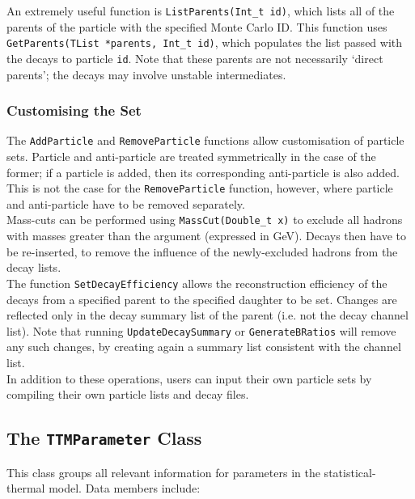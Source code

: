 \documentclass{elsarticle}
\begin{document}
An extremely useful function is \texttt{ListParents(Int\_t id)}, which lists all 
of the parents of the particle with the specified Monte Carlo ID. This function uses 
\texttt{GetParents(TList *parents, Int\_t id)}, which populates the list passed with 
the decays to particle \texttt{id}. Note that these parents are 
not necessarily `direct parents'; the decays may involve unstable intermediates. 

\subsubsection{Customising the Set}

The \texttt{AddParticle} and \texttt{RemoveParticle} functions allow customisation of particle sets. 
Particle and anti-particle are treated symmetrically 
in the case of the former; if a particle is added, then its corresponding anti-particle is also 
added. This is not the case for the \texttt{RemoveParticle} function, however, where particle 
and anti-particle have to be removed separately.\\ 

Mass-cuts can be performed using 
\texttt{MassCut(Double\_t x)} to exclude 
all hadrons with masses greater than the argument (expressed in GeV). Decays then have to be re-inserted, 
to remove the influence of the newly-excluded hadrons from the decay lists.\\ 

The function \texttt{SetDecayEfficiency} allows the reconstruction efficiency 
of the decays from a specified parent to the specified daughter to be set. 
Changes are reflected only in the decay summary list of the parent (i.e. not 
the decay channel list). Note that running 
\texttt{UpdateDecaySummary} or \texttt{GenerateBRatios} will remove any such 
changes, by creating again a summary list consistent with the channel list.\\    

In addition to these operations, users can input their own particle sets by 
compiling their own particle lists and decay files.\\

\subsection{The \texttt{TTMParameter} Class}

This class groups all relevant information for parameters in the statistical-thermal model. Data members include:\\
\end{document}
